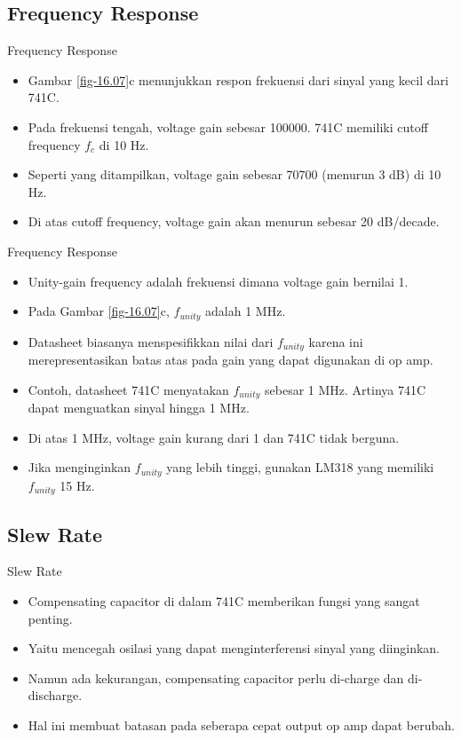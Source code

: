 \subsection{Frequency Response}

\begin{frame}{Frequency Response}
	\begin{itemize}
		\item Gambar \ref{fig-16.07}c menunjukkan respon frekuensi dari sinyal yang kecil dari 741C.
		\item Pada frekuensi tengah, voltage gain sebesar 100000.
		741C memiliki cutoff frequency $ f_c $ di 10 Hz.
		\item Seperti yang ditampilkan, voltage gain sebesar 70700 (menurun 3 dB) di 10 Hz.
		\item Di atas cutoff frequency, voltage gain akan menurun sebesar 20 dB/decade.
	\end{itemize}
\end{frame}

\begin{frame}{Frequency Response}
	\begin{itemize}
		\item Unity-gain frequency adalah frekuensi dimana voltage gain bernilai 1.
		\item Pada Gambar \ref{fig-16.07}c, $ f_{unity} $ adalah 1 MHz.
		\item Datasheet biasanya menspesifikkan nilai dari $ f_{unity} $ karena ini merepresentasikan batas atas pada gain yang dapat digunakan di op amp.
		\item Contoh, datasheet 741C menyatakan $ f_{unity} $ sebesar 1 MHz. Artinya 741C dapat menguatkan sinyal hingga 1 MHz.
		\item Di atas 1 MHz, voltage gain kurang dari 1 dan 741C tidak berguna.
		\item Jika menginginkan $ f_{unity} $ yang lebih tinggi, gunakan LM318 yang memiliki $ f_{unity} $ 15 Hz.
	\end{itemize}
\end{frame}

\subsection{Slew Rate}

\begin{frame}{Slew Rate}
	\begin{itemize}
		\item Compensating capacitor di dalam 741C memberikan fungsi yang sangat penting.
		\item Yaitu mencegah osilasi yang dapat menginterferensi sinyal yang diinginkan.
		\item Namun ada kekurangan, compensating capacitor perlu di-charge dan di-discharge.
		\item Hal ini membuat batasan pada seberapa cepat output op amp dapat berubah.
	\end{itemize}
\end{frame}

